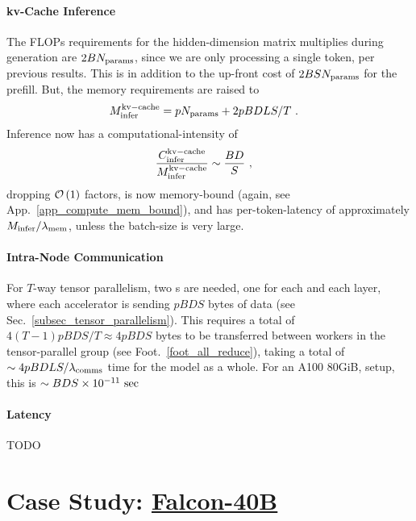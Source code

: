 \documentclass[11pt]{article}
\begin{document}
\paragraph{kv-Cache Inference}
The FLOPs requirements for the hidden-dimension matrix multiplies during generation are $2BN _{ {\rm params}  } $,
since we are only processing a single token, per previous results.   This is in addition to the up-front cost of $ 2BSN _{
			{\rm params}} $ for the prefill. But, the memory requirements are raised to
\begin{align}
	M _{ {\rm infer}  }^{ {\rm kv-cache}  } & =pN _{ {\rm params}  } + 2pBDLS/T\ .
\end{align}
Inference now has a computational-intensity of
\begin{align}
	\frac{ C _{ {\rm infer} } ^{ {\rm kv-cache} } }{ M _{ {\rm infer}  }^{ {\rm kv-cache}  } } & \sim \frac{ BD }{ S } \ ,
\end{align}
dropping $ \mathcal{O} \left( 1 \right)  $ factors, is now memory-bound (again, see
App.~\ref{app_compute_mem_bound}), and has per-token-latency of approximately $ M _{ {\rm infer} }/
	\lambda _{ {\rm mem} }$, unless the batch-size is very large.


\paragraph{Intra-Node Communication} For $ T $-way tensor parallelism, two s are
needed, one for each  and each  layer, where each
accelerator is sending $ pBDS  $ bytes of data (see Sec.~\ref{subsec_tensor_parallelism}). This
requires a total of $ 4\left ( T-1 \right ) pBDS/T \approx 4pBDS $ bytes to be transferred between
workers in the tensor-parallel group (see Foot.~\ref{foot_all_reduce}), taking a total of $ \sim  4pBDLS/
	\lambda _{ {\rm comms} }  $ time for the model as a whole. For an A100 80GiB,  setup, this is $ \sim
	BDS \times  10 ^{ -11 } \ {\rm sec} $


\paragraph{Latency} TODO



\section{Case Study: \href{https://huggingface.co/tiiuae/falcon-40b-instruct?_sm_vck=j230jZ2ssDkkPfJTfRt6tjQNTQZJ65N7VDWmj5Ff6f3jZ3mhh2Pq}{Falcon-40B}}
\end{document}
